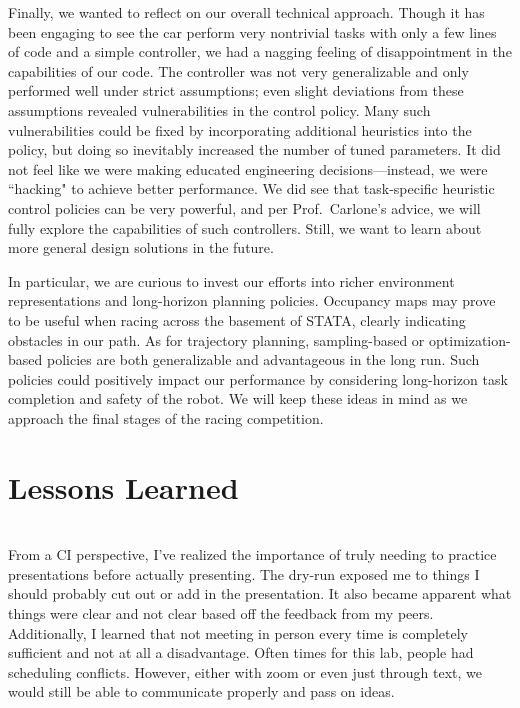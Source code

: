 \documentclass{article}
\begin{document}
Finally, we wanted to reflect on our overall technical approach.
Though it has been engaging to see the car perform very nontrivial tasks with only a few lines of code and a simple controller, we had a nagging feeling of disappointment in the capabilities of our code.
The controller was not very generalizable and only performed well under strict assumptions; even slight deviations from these assumptions revealed vulnerabilities in the control policy.
Many such vulnerabilities could be fixed by incorporating additional heuristics into the policy, but doing so inevitably increased the number of tuned parameters.
It did not feel like we were making educated engineering decisions---instead, we were ``hacking" to achieve better performance.
We did see that task-specific heuristic control policies can be very powerful, and per Prof.\ Carlone's advice, we will fully explore the capabilities of such controllers.
Still, we want to learn about more general design solutions in the future.

In particular, we are curious to invest our efforts into richer environment representations and long-horizon planning policies.
Occupancy maps may prove to be useful when racing across the basement of STATA, clearly indicating obstacles in our path.
As for trajectory planning, sampling-based or optimization-based policies are both generalizable and advantageous in the long run.
Such policies could positively impact our performance by considering long-horizon task completion and safety of the robot.
We will keep these ideas in mind as we approach the final stages of the racing competition.






\section{Lessons Learned}
\author{\textbf{Jeremiah Budiman}} \\

From a CI perspective, I've realized the importance of truly needing to practice presentations before actually presenting. The dry-run exposed me to things I should probably cut out or add in the presentation. It also became apparent what things were clear and not clear based off the feedback from my peers. Additionally, I learned that not meeting in person every time is completely sufficient and not at all a disadvantage. Often times for this lab, people had scheduling conflicts. However, either with zoom or even just through text, we would still be able to communicate properly and pass on ideas. \\
\end{document}
